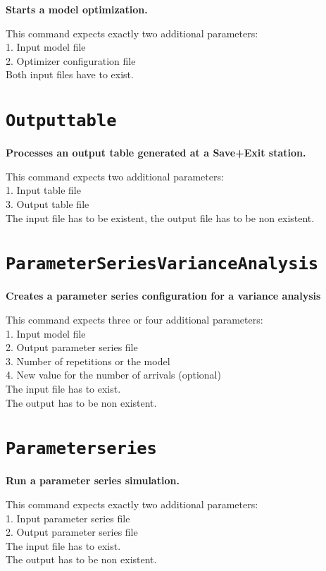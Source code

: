 \textbf{Starts a model optimization.}

This command expects exactly two additional parameters:\\
1. Input model file\\
2. Optimizer configuration file\\
Both input files have to exist.

\section{\texttt{Outputtable}}

\textbf{Processes an output table generated at a Save+Exit station.}

This command expects two additional parameters:\\
1. Input table file\\
3. Output table file\\
The input file has to be existent, the output file has to be non existent.

\section{\texttt{ParameterSeriesVarianceAnalysis}}

\textbf{Creates a parameter series configuration for a variance analysis}

This command expects three or four additional parameters:\\
1. Input model file\\
2. Output parameter series file\\
3. Number of repetitions or the model\\
4. New value for the number of arrivals (optional)\\
The input file has to exist.\\
The output has to be non existent.

\section{\texttt{Parameterseries}}

\textbf{Run a parameter series simulation.}

This command expects exactly two additional parameters:\\
1. Input parameter series file\\
2. Output parameter series file\\
The input file has to exist.\\
The output has to be non existent.

